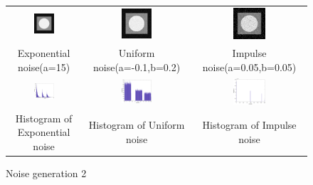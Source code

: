 \documentclass[11pt,a4paper]{article}
\begin{document}
\begin{figure}[!htbp]
	\centering
	\begin{tabular}{ccc} 
		\includegraphics[width=0.3\textwidth]{pro4/exponential}&
		\includegraphics[width=0.3\textwidth]{pro4/uniform}&
		\includegraphics[width=0.3\textwidth]{pro4/impulse} \\
		Exponential noise(a=15) &  Uniform noise(a=-0.1,b=0.2) &  Impulse noise(a=0.05,b=0.05)\\
		\includegraphics[width=0.3\textwidth]{pro4/exponentialHist}&
		\includegraphics[width=0.3\textwidth]{pro4/uniformHist}&
		\includegraphics[width=0.3\textwidth]{pro4/impulseHist} \\
		 Histogram of Exponential noise &  Histogram of Uniform noise &  Histogram of Impulse noise
	\end{tabular}
	\caption{Noise generation 2}
	\label{pro4_fig2}
\end{figure}
\end{document}
